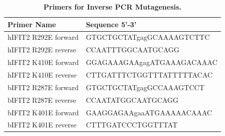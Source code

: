 \begin{table}
\centering
\begin{tabular}{ll}
\toprule
\textbf{Primer Name}   & \textbf{Sequence 5'-3'}    \\ \midrule
hIFIT2   R292E forward & GTGCTGCTATgagGCAAAAGTCTTC  \\ 
hIFIT2 R292E reverse   & CCAATTTGGCAATGCAGG         \\ 
hIFIT2   K410E forward & GGAGAAAGAAgagATGAAAGACAAAC \\ 
hIFIT2 K410E reverse   & CTTGATTTCTGGTTTATTTTTACAC  \\ 
bIFIT2   R287E forward & GTGCTGCTATgagGCCAAAGTCCT   \\ 
bIFIT2 R287E reverse   & CCAATATGGCAATGCAGG         \\ 
bIFIT2   K401E forward & GAAGGAGAAgaaATGAAAAACAAAC  \\ 
bIFIT2 K401E reverse   & CTTTGATCCCTGGTTTAT         \\ \bottomrule
\end{tabular}
\caption[Primers for Inverse PCR Mutagenesis.]{\textbf{Primers for Inverse PCR Mutagenesis.}}
\label{tab:Primers for Inverse PCR Mutagenesis table}
\end{table}

